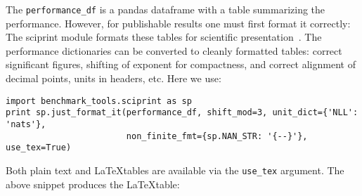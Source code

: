 \documentclass{article}
\newcommand{\code}{\texttt}
\begin{document}
The \code{performance\_df} is a pandas dataframe with a table summarizing the performance.
However, for publishable results one must first format it correctly:
The sciprint module formats these tables for scientific presentation~\citep{Cole2015}.
The performance dictionaries can be converted to cleanly formatted tables: correct significant figures, shifting of exponent for compactness, and correct alignment of decimal points, units in headers, etc.
Here we use:
\begin{verbatim}
import benchmark_tools.sciprint as sp
print sp.just_format_it(performance_df, shift_mod=3, unit_dict={'NLL': 'nats'},
                        non_finite_fmt={sp.NAN_STR: '{--}'}, use_tex=True)
\end{verbatim}
Both plain text and \LaTeX tables are available via the \code{use\_tex} argument.
The above snippet produces the \LaTeX table:\\
\end{document}
